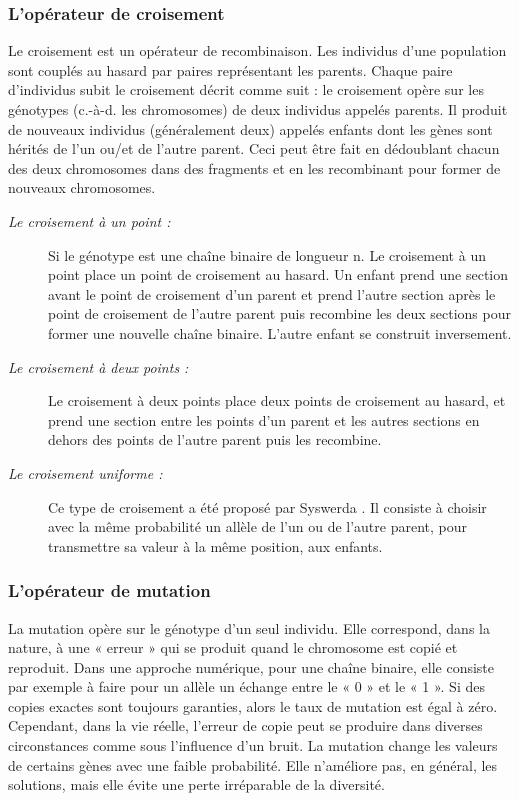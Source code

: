 \documentclass[12pt,a4paper]{article}
\begin{document}
	\subsubsection{L’opérateur de croisement}
	Le croisement est un opérateur de recombinaison. Les individus d’une population sont couplés au hasard par paires représentant les parents. Chaque paire d’individus
subit le croisement décrit comme suit : le croisement opère sur les génotypes (c.-à-d. les chromosomes) de deux individus appelés parents. Il produit de nouveaux individus (généralement deux) appelés enfants dont les gènes sont hérités de l’un ou/et de l’autre parent. Ceci peut être fait en dédoublant chacun des deux chromosomes dans des fragments et en les recombinant pour former de nouveaux chromosomes.
	\begin{description}
		\item[\textsl{Le croisement à un point :}] Si le génotype est une chaîne binaire de longueur n. Le croisement à un point place un point de croisement au
hasard. Un enfant prend une section avant le point de croisement d’un parent et prend l’autre section après le point de croisement de l’autre parent puis recombine les deux sections pour former une nouvelle chaîne binaire. L’autre enfant se construit inversement. 
		
		\item[\textsl{Le croisement à deux points :}]Le croisement à deux points place deux points de croisement au hasard, et prend une section entre les points d’un parent et les autres sections en dehors des points de l’autre parent puis les recombine. 
	
		\item[\textsl{Le croisement uniforme :}]Ce type de croisement a été proposé par Syswerda \cite{Syswerda}. Il consiste à choisir avec la même probabilité un allèle de l’un ou de l’autre parent, pour transmettre sa valeur à la même position, aux enfants. 
	
	\end{description}
	
	\subsubsection{L'opérateur de mutation}
	
	La mutation opère sur le génotype d’un seul individu. Elle correspond, dans la nature, à une « erreur » qui se produit quand le chromosome est copié et reproduit. Dans une approche numérique, pour une chaîne binaire, elle consiste par exemple à faire pour un allèle un échange entre le « 0 » et le « 1 ». Si des copies exactes sont toujours garanties, alors le taux de mutation est égal à zéro. Cependant, dans la vie réelle, l’erreur de copie peut se produire dans diverses circonstances comme sous l’influence d’un bruit. La mutation change les valeurs de certains gènes avec une faible probabilité. Elle n’améliore pas, en général, les solutions, mais elle évite une perte irréparable de la diversité.
	
\end{document}
